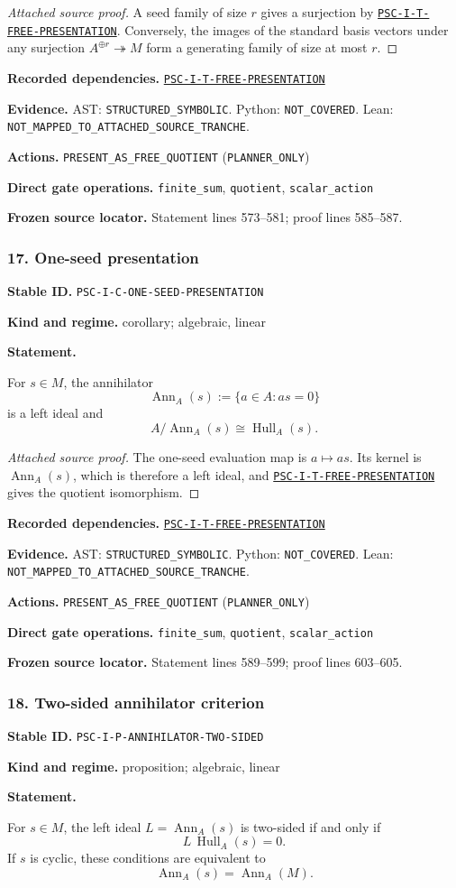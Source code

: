 \documentclass[a4paper,11pt]{article}
\newcommand{\Hull}{\operatorname{Hull}}\newcommand{\srank}{\operatorname{srank}}\newcommand{\psrank}{\operatorname{psrank}}\newcommand{\End}{\operatorname{End}}\newcommand{\Hom}{\operatorname{Hom}}\newcommand{\im}{\operatorname{im}}\newcommand{\Ker}{\operatorname{Ker}}\newcommand{\Jac}{\operatorname{Jac}}\newcommand{\Irr}{\operatorname{Irr}}\newcommand{\Span}{\operatorname{span}}\newcommand{\alg}{\operatorname{alg}}\newcommand{\Reach}{\operatorname{Reach}}\newcommand{\Supp}{\operatorname{Supp}}\newcommand{\id}{\mathrm{id}}\newcommand{\cl}[1]{\overline{#1}}
\newcommand{\field}[2]{\noindent\textbf{#1.} #2\par}
\begin{document}
\begin{proof}[Attached source proof]
A seed family of size $r$ gives a surjection by \hyperref[rec:PSC-I-T-FREE-PRESENTATION]{\nolinkurl{PSC-I-T-FREE-PRESENTATION}}.  Conversely, the images of the standard basis vectors under any surjection $A^{\oplus r}\twoheadrightarrow M$ form a generating family of size at most $r$.
\end{proof}
\field{Recorded dependencies}{\hyperref[rec:PSC-I-T-FREE-PRESENTATION]{\nolinkurl{PSC-I-T-FREE-PRESENTATION}}}
\field{Evidence}{AST: \nolinkurl{STRUCTURED_SYMBOLIC}. Python: \nolinkurl{NOT_COVERED}. Lean: \nolinkurl{NOT_MAPPED_TO_ATTACHED_SOURCE_TRANCHE}.}
\field{Actions}{\nolinkurl{PRESENT_AS_FREE_QUOTIENT} (\nolinkurl{PLANNER_ONLY})}
\field{Direct gate operations}{\nolinkurl{finite_sum}, \nolinkurl{quotient}, \nolinkurl{scalar_action}}
\field{Frozen source locator}{Statement lines 573--581; proof lines 585--587.}
\subsubsection*{17. One-seed presentation}
\label{rec:PSC-I-C-ONE-SEED-PRESENTATION}
\field{Stable ID}{\nolinkurl{PSC-I-C-ONE-SEED-PRESENTATION}}
\field{Kind and regime}{corollary; algebraic, linear}
\textbf{Statement.}\par
For $s\in M$, the annihilator
\[
\operatorname{Ann}_A(s):=\{a\in A:as=0\}
\]
is a left ideal and
\[
\boxed{A/\operatorname{Ann}_A(s)\cong\Hull_A(s).}
\]

\begin{proof}[Attached source proof]
The one-seed evaluation map is $a\mapsto as$.  Its kernel is $\operatorname{Ann}_A(s)$, which is therefore a left ideal, and \hyperref[rec:PSC-I-T-FREE-PRESENTATION]{\nolinkurl{PSC-I-T-FREE-PRESENTATION}} gives the quotient isomorphism.
\end{proof}
\field{Recorded dependencies}{\hyperref[rec:PSC-I-T-FREE-PRESENTATION]{\nolinkurl{PSC-I-T-FREE-PRESENTATION}}}
\field{Evidence}{AST: \nolinkurl{STRUCTURED_SYMBOLIC}. Python: \nolinkurl{NOT_COVERED}. Lean: \nolinkurl{NOT_MAPPED_TO_ATTACHED_SOURCE_TRANCHE}.}
\field{Actions}{\nolinkurl{PRESENT_AS_FREE_QUOTIENT} (\nolinkurl{PLANNER_ONLY})}
\field{Direct gate operations}{\nolinkurl{finite_sum}, \nolinkurl{quotient}, \nolinkurl{scalar_action}}
\field{Frozen source locator}{Statement lines 589--599; proof lines 603--605.}
\subsubsection*{18. Two-sided annihilator criterion}
\label{rec:PSC-I-P-ANNIHILATOR-TWO-SIDED}
\field{Stable ID}{\nolinkurl{PSC-I-P-ANNIHILATOR-TWO-SIDED}}
\field{Kind and regime}{proposition; algebraic, linear}
\textbf{Statement.}\par
For $s\in M$, the left ideal $L=\operatorname{Ann}_A(s)$ is two-sided if and only if
\[
L\,\Hull_A(s)=0.
\]
If $s$ is cyclic, these conditions are equivalent to
\[
\operatorname{Ann}_A(s)=\operatorname{Ann}_A(M).
\]
\end{document}
